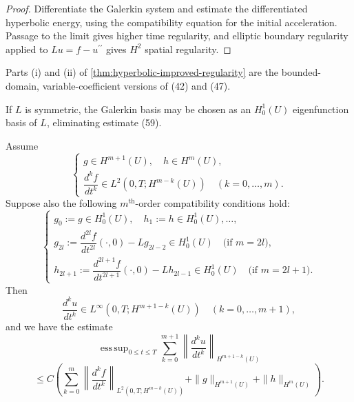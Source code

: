 \begin{proof}
\sketch Differentiate the Galerkin system and estimate the differentiated hyperbolic energy, using the compatibility equation for the initial acceleration. Passage to the limit gives higher time regularity, and elliptic boundary regularity applied to $Lu=f-u^{\prime\prime}$ gives $H^2$ spatial regularity.
\end{proof}

\begin{remark}
\label{rem:hyperbolic-improved-regularity-remark}
Parts (i) and (ii) of \cref{thm:hyperbolic-improved-regularity} are the bounded-domain, variable-coefficient versions of (42) and (47).
\end{remark}

\begin{remark}
\label{rem:hyperbolic-symmetric-eigenfunctions}
If $L$ is symmetric, the Galerkin basis may be chosen as an $H_0^1(U)$ eigenfunction basis of $L$, eliminating estimate (59).
\end{remark}

\begin{theorem}
\label{thm:hyperbolic-higher-regularity}
Assume
\[
\begin{cases}
g \in H^{m+1}(U), \quad h \in H^m(U), \\
\dfrac{d^k f}{dt^k} \in L^2(0, T; H^{m-k}(U)) \quad (k = 0, \ldots, m).
\end{cases}
\]
Suppose also the following $m^{\text{th}}$-order compatibility conditions hold:
\[
\begin{cases}
g_0 := g \in H^1_0(U), \quad h_1 := h \in H^1_0(U), \ldots, \\
g_{2l} := \dfrac{d^{2l}f}{dt^{2l}}(\cdot, 0) - Lg_{2l-2} \in H^1_0(U)
  \quad \text{(if } m = 2l\text{)}, \\
h_{2l+1} := \dfrac{d^{2l+1}f}{dt^{2l+1}}(\cdot, 0) - Lh_{2l-1} \in H^1_0(U)
  \quad \text{(if } m = 2l + 1\text{)}.
\end{cases}
\tag{62}
\]
Then
\[
\frac{d^k u}{dt^k} \in L^\infty(0, T; H^{m+1-k}(U)) \quad (k = 0, \ldots, m+1),
\tag{63}
\]
and we have the estimate
\[
\operatorname{ess\,sup}_{0 \le t \le T} \sum_{k=0}^{m+1} \left\| \frac{d^k u}{dt^k} \right\|_{H^{m+1-k}(U)}
\]
\[
\le C \left( \sum_{k=0}^{m} \left\| \frac{d^k f}{dt^k} \right\|_{L^2(0,T;H^{m-k}(U))} + \|g\|_{H^{m+1}(U)} + \|h\|_{H^m(U)} \right).
\tag{64}
\]
\end{theorem}

